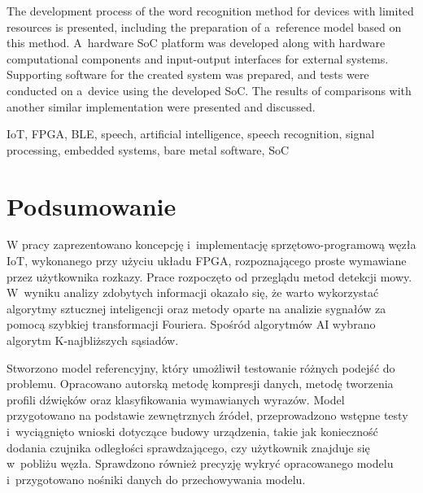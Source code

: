 \documentclass[
    left=2.5cm,         %
    right=2.5cm,        %
    top=2.5cm,          %
    bottom=3cm,         %
    bindingoffset=6mm,  %
    nohyphenation=true %
]{eiti/eiti-thesis} %
\begin{document}
The development process of the word recognition method for devices with limited resources is presented, including the preparation of a~reference model based on this method. A~hardware SoC platform was developed along with hardware computational components and input-output interfaces for external systems. Supporting software for the created system was prepared, and tests were conducted on a~device using the developed SoC. The results of comparisons with another similar implementation were presented and discussed.


\keywords IoT, FPGA, BLE, speech, artificial intelligence, speech recognition, signal processing, embedded systems, bare metal software, SoC
\newpage

\makeauthorship
\blankpage

\thispagestyle{empty}
\tableofcontents

\newpage %
\section{Podsumowanie}      %
W pracy zaprezentowano koncepcję i~implementację sprzętowo-programową węzła IoT, wykonanego przy użyciu układu FPGA, rozpoznającego proste wymawiane przez użytkownika rozkazy. Prace rozpoczęto od przeglądu metod detekcji mowy. W~wyniku analizy zdobytych informacji okazało się, że warto wykorzystać algorytmy sztucznej inteligencji oraz metody oparte na analizie sygnałów za pomocą szybkiej transformacji Fouriera. Spośród algorytmów AI wybrano algorytm K-najbliższych sąsiadów.

Stworzono model referencyjny, który umożliwił testowanie różnych podejść do problemu. Opracowano autorską metodę kompresji danych, metodę tworzenia profili dźwięków oraz klasyfikowania wymawianych wyrazów. Model przygotowano na podstawie zewnętrznych źródeł, przeprowadzono wstępne testy i~wyciągnięto wnioski dotyczące budowy urządzenia, takie jak konieczność dodania czujnika odległości sprawdzającego, czy użytkownik znajduje się w~pobliżu węzła. Sprawdzono również precyzję wykryć opracowanego modelu i~przygotowano nośniki danych do przechowywania modelu.
\end{document}
